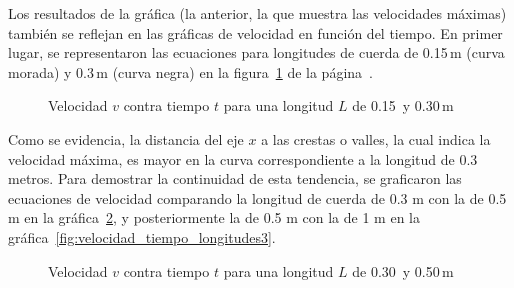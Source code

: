 \documentclass[letterpaper]{report}
\numberwithin{table}{section}
\begin{document}
Los resultados de la gráfica (la anterior, la que muestra las
velocidades máximas) también se reflejan en las gráficas de
velocidad en función del tiempo. En primer lugar, se representaron
las ecuaciones para longitudes de cuerda de 0.15\,m (curva morada) y
0.3\,m (curva negra) en la
figura~\ref{fig:velocidad_tiempo_longitudes} de la
página~\pageref{fig:velocidad_tiempo_longitudes}.

\begin{figure}[H]
  \centering
  \caption{Velocidad $v$ contra tiempo $t$ para una longitud $L$ de
  0.15\, y 0.30\,m}\label{fig:velocidad_tiempo_longitudes}
\end{figure}

Como se evidencia, la distancia del eje $x$ a las crestas o valles, la
cual indica la velocidad máxima, es mayor en la curva correspondiente
a la longitud de 0.3 metros. Para demostrar la continuidad de esta
tendencia, se graficaron las ecuaciones de velocidad comparando la
longitud de cuerda de 0.3 m con la de 0.5 m en la
gráfica~\ref{fig:velocidad_tiempo_longitudes2}, y
posteriormente la de 0.5 m con la de 1 m en la
gráfica~\ref{fig:velocidad_tiempo_longitudes3}.

\begin{figure}[H]
  \centering
  \caption{Velocidad $v$ contra tiempo $t$ para una longitud $L$ de
  0.30\, y 0.50\,m}\label{fig:velocidad_tiempo_longitudes2}
\end{figure}
\end{document}
